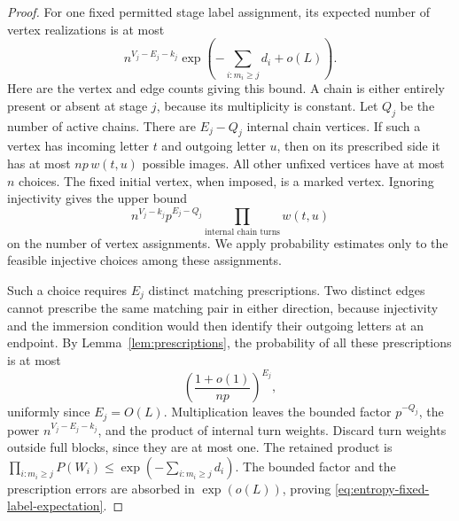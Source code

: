 \begin{proof}
For one fixed permitted stage label assignment, its expected number of
vertex realizations is at most
\begin{equation}
 n^{V_j-E_j-k_j}
 \exp\left(-\sum_{i:m_i\ge j}d_i+o(L)\right).
 \label{eq:entropy-fixed-label-expectation}
\end{equation}
Here are the vertex and edge counts giving this bound.  A chain is
either entirely present or absent at stage \(j\), because its
multiplicity is constant.  Let \(Q_j\) be the number of active chains.
There are \(E_j-Q_j\) internal chain vertices.  If such a vertex has
incoming letter \(t\) and outgoing letter \(u\), then on its prescribed
side it has at most \(np\,w(t,u)\) possible images.  All other unfixed
vertices have at most \(n\) choices.  The fixed initial vertex, when
imposed, is a marked vertex.  Ignoring injectivity gives the upper bound
\[
 n^{V_j-k_j}p^{E_j-Q_j}
 \prod_{\text{internal chain turns}}w(t,u)
\]
on the number of vertex assignments.  We apply probability estimates
only to the feasible injective choices among these assignments.

Such a choice requires \(E_j\) distinct matching prescriptions.  Two
distinct edges cannot prescribe the same matching pair in either
direction, because injectivity and the immersion condition would then
identify their outgoing letters at an endpoint.  By
Lemma~\ref{lem:prescriptions}, the probability of all these prescriptions
is at most
\[
 \left(\frac{1+o(1)}{np}\right)^{E_j},
\]
uniformly since \(E_j=O(L)\).  Multiplication leaves the bounded factor
\(p^{-Q_j}\), the power \(n^{V_j-E_j-k_j}\), and the product of internal
turn weights.  Discard turn weights outside full blocks, since they
are at most one.  The retained product is
\(\prod_{i:m_i\ge j}P(W_i)\le\exp(-\sum_{i:m_i\ge j}d_i)\).
The bounded factor and the prescription errors are absorbed in
\(\exp(o(L))\), proving \eqref{eq:entropy-fixed-label-expectation}.


\end{proof}
